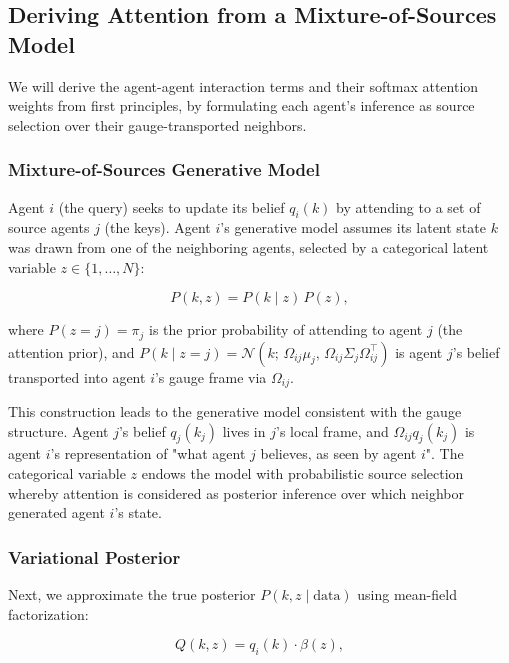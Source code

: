 \documentclass[twoside,11pt]{article}
\begin{document}
\subsection{Deriving Attention from a Mixture-of-Sources Model}
\label{sec:mixture_derivation}

We will derive the agent-agent interaction terms and their softmax attention weights from first principles, by formulating each agent's inference as source selection over their gauge-transported neighbors.

\subsubsection{Mixture-of-Sources Generative Model}

Agent $i$ (the query) seeks to update its belief $q_i(k)$ by attending to a set of source agents $j$ (the keys). Agent $i$'s generative model assumes its latent state $k$ was drawn from one of the neighboring agents, selected by a categorical latent variable $z \in \{1, \ldots, N\}$:

\begin{equation}
P(k, z) = P(k \mid z)\, P(z),
\label{eq:mixture_joint}
\end{equation}

where $P(z = j) = \pi_j$ is the prior probability of attending to agent $j$ (the attention prior), and $P(k \mid z = j) = \mathcal{N}(k;\, \Omega_{ij}\mu_j,\, \Omega_{ij}\Sigma_j\Omega_{ij}^\top)$ is agent $j$'s belief transported into agent $i$'s gauge frame via $\Omega_{ij}$.

This construction leads to the generative model consistent with the gauge structure. Agent $j$'s belief $q_j(k_j)$ lives in $j$'s local frame, and $\Omega_{ij}q_j(k_j)$ is agent $i$'s representation of "what agent $j$ believes, as seen by agent $i$". The categorical variable $z$ endows the model with probabilistic source selection whereby attention is considered as posterior inference over which neighbor generated agent $i$'s state. 

\subsubsection{Variational Posterior}

Next, we approximate the true posterior $P(k, z \mid \text{data})$ using mean-field factorization:

\begin{equation}
Q(k, z) = q_i(k) \cdot \beta(z),
\label{eq:mixture_posterior}
\end{equation}
\end{document}
